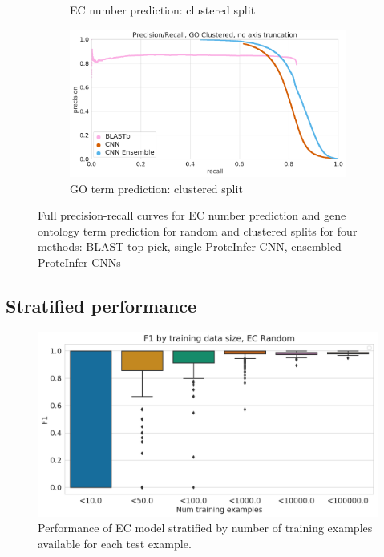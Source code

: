 \begin{figure}[ht]
\begin{subfigure}[b]{0.5\linewidth}
    \caption{EC number prediction: clustered split} 
    \label{without_ensemble:c} 
  \end{subfigure}%
  \begin{subfigure}[b]{0.5\linewidth}
    \centering
    \includegraphics[width=0.9\linewidth]{Figures/prc_go_clustered_unzoomed.png}
    \caption{GO term prediction: clustered split} 
    \label{without_ensemble:d} 
  \end{subfigure} 
  \caption{Full precision-recall curves for EC number prediction and gene ontology term prediction for random and clustered splits for four methods: BLAST top pick, single ProteInfer CNN, ensembled ProteInfer CNNs }
  \label{without_ensemble} 
\end{figure}



\pagebreak
\subsection{Stratified performance}
\begin{figure}[htbp]
\centering
  \includegraphics[width=\textwidth]{Figures/ec_f1_by_training_size.png}
  \caption{Performance of EC model stratified by number of training examples available for each test example.}
  \label{sup:fig:ec_f1_by_training_size}
\end{figure}
\pagebreak
